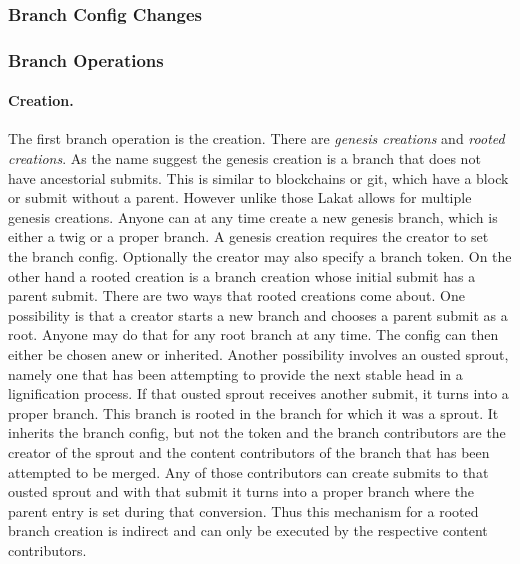 \documentclass[14pt]{article}
\begin{document}
\subsubsection{Branch Config Changes}
\label{ssc:configchange}


\subsubsection{Branch Operations}
\label{ssc:branchops}


\paragraph{Creation.} The first branch operation is the creation. There are \textit{genesis creations} and \textit{rooted creations}. As the name suggest the genesis creation is a branch that does not have ancestorial submits. This is similar to blockchains or git, which have a block or submit without a parent. However unlike those Lakat allows for multiple genesis creations. Anyone can at any time create a new genesis branch, which is either a twig or a proper branch. A genesis creation requires the creator to set the branch config. Optionally the creator may also specify a branch token. 
On the other hand a rooted creation is a branch creation whose initial submit has a parent submit. There are two ways that rooted creations come about. One possibility is that a creator starts a new branch and chooses a parent submit as a root. Anyone may do that for any root branch at any time. The config can then either be chosen anew or inherited. Another possibility involves an ousted sprout, namely one that has been attempting to provide the next stable head in a lignification process. If that ousted sprout receives another submit, it turns into a proper branch. This branch is rooted in the branch for which it was a sprout. It inherits the branch config, but not the token and the branch contributors are the creator of the sprout and the content contributors of the branch that has been attempted to be merged. Any of those contributors can create submits to that ousted sprout and with that submit it turns into a proper branch where the parent entry is set during that conversion. Thus this mechanism for a rooted branch creation is indirect and can only be executed by the respective content contributors.
\end{document}
